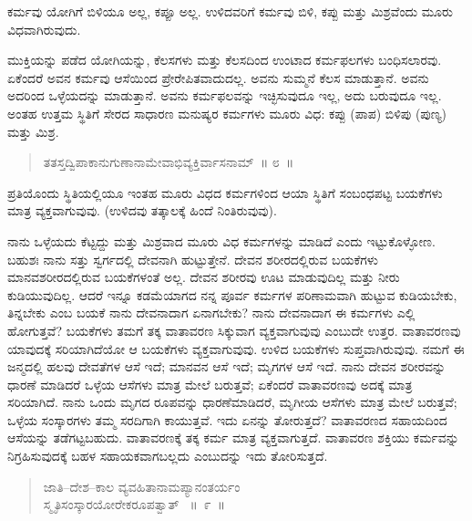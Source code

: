 ಕರ್ಮವು ಯೋಗಿಗೆ ಬಿಳಿಯೂ ಅಲ್ಲ, ಕಪ್ಪೂ ಅಲ್ಲ. ಉಳಿದವರಿಗೆ ಕರ್ಮವು ಬಿಳಿ, ಕಪ್ಪು ಮತ್ತು ಮಿಶ್ರವೆಂದು ಮೂರು ವಿಧವಾಗಿರುವುದು. 

ಮುಕ್ತಿಯನ್ನು ಪಡೆದ ಯೋಗಿಯನ್ನು, ಕೆಲಸಗಳು ಮತ್ತು ಕೆಲಸದಿಂದ ಉಂಟಾದ ಕರ್ಮಫಲಗಳು ಬಂಧಿಸಲಾರವು. ಏಕೆಂದರೆ ಅವನ ಕರ್ಮವು ಆಸೆಯಿಂದ ಪ್ರೇರೇಪಿತವಾದುದಲ್ಲ. ಅವನು ಸುಮ್ಮನೆ ಕೆಲಸ ಮಾಡುತ್ತಾನೆ. ಅವನು ಅದರಿಂದ ಒಳ್ಳೆಯದನ್ನು ಮಾಡುತ್ತಾನೆ. ಅವನು ಕರ್ಮಫಲವನ್ನು ಇಚ್ಛಿಸುವುದೂ ಇಲ್ಲ, ಅದು ಬರುವುದೂ ಇಲ್ಲ. ಅಂತಹ ಉತ್ತಮ ಸ್ಥಿತಿಗೆ ಸೇರದ ಸಾಧಾರಣ ಮನುಷ್ಯರ ಕರ್ಮಗಳು ಮೂರು ವಿಧ: ಕಪ್ಪು (ಪಾಪ) ಬಿಳಿಪು (ಪುಣ್ಯ) ಮತ್ತು ಮಿಶ್ರ. 

\vspace{-0.3cm}

\begin{verse}
ತತಸ್ತದ್ವಿಪಾಕಾನುಗುಣಾನಾಮೇವಾಭಿವ್ಯಕ್ತಿರ್ವಾಸನಾಮ್​~॥ ೮~॥
\end{verse}

\vspace{-0.3cm}

ಪ್ರತಿಯೊಂದು ಸ್ಥಿತಿಯಲ್ಲಿಯೂ ಇಂತಹ ಮೂರು ವಿಧದ ಕರ್ಮಗಳಿಂದ ಆಯಾ ಸ್ಥಿತಿಗೆ ಸಂಬಂಧಪಟ್ಟ ಬಯಕೆಗಳು ಮಾತ್ರ ವ್ಯಕ್ತವಾಗುವುವು. (ಉಳಿದವು ತತ್ಕಾಲಕ್ಕೆ ಹಿಂದೆ ನಿಂತಿರುವುವು). 

ನಾನು ಒಳ್ಳೆಯದು ಕೆಟ್ಟದ್ದು ಮತ್ತು ಮಿಶ್ರವಾದ ಮೂರು ವಿಧ ಕರ್ಮಗಳನ್ನು ಮಾಡಿದೆ ಎಂದು ಇಟ್ಟುಕೊಳ್ಳೋಣ. ಬಹುಶಃ ನಾನು ಸತ್ತು ಸ್ವರ್ಗದಲ್ಲಿ ದೇವನಾಗಿ ಹುಟ್ಟುತ್ತೇನೆ. ದೇವನ ಶರೀರದಲ್ಲಿರುವ ಬಯಕೆಗಳು ಮಾನವಶರೀರದಲ್ಲಿರುವ ಬಯಕೆಗಳಂತೆ ಅಲ್ಲ. ದೇವನ ಶರೀರವು ಊಟ ಮಾಡುವುದಿಲ್ಲ ಮತ್ತು ನೀರು ಕುಡಿಯುವುದಿಲ್ಲ. ಆದರೆ ಇನ್ನೂ ಕಡಮೆಯಾಗದ ನನ್ನ ಪೂರ್ವ ಕರ್ಮಗಳ ಪರಿಣಾಮವಾಗಿ ಹುಟ್ಟುವ ಕುಡಿಯಬೇಕು, ತಿನ್ನಬೇಕು ಎಂಬ ಬಯಕೆ ನಾನು ದೇವನಾದಾಗ ಏನಾಗಬೇಕು? ನಾನು ದೇವನಾದಾಗ ಈ ಕರ್ಮಗಳು ಎಲ್ಲಿ ಹೋಗುತ್ತವೆ? ಬಯಕೆಗಳು ತಮಗೆ ತಕ್ಕ ವಾತಾವರಣ ಸಿಕ್ಕುವಾಗ ವ್ಯಕ್ತವಾಗುವುವು ಎಂಬುದೇ ಉತ್ತರ. ವಾತಾವರಣವು ಯಾವುದಕ್ಕೆ ಸರಿಯಾಗಿದೆಯೋ ಆ ಬಯಕೆಗಳು ವ್ಯಕ್ತವಾಗುವುವು. ಉಳಿದ ಬಯಕೆಗಳು ಸುಪ್ತವಾಗಿರುವುವು. ನಮಗೆ ಈ ಜನ್ಮದಲ್ಲಿ ಹಲವು ದೇವತೆಗಳ ಆಸೆ ಇದೆ; ಮಾನವನ ಆಸೆ ಇದೆ; ಮೃಗಗಳ ಆಸೆ ಇದೆ. ನಾನು ದೇವನ ಶರೀರವನ್ನು ಧಾರಣೆ ಮಾಡಿದರೆ ಒಳ್ಳೆಯ ಆಸೆಗಳು ಮಾತ್ರ ಮೇಲೆ ಬರುತ್ತವೆ; ಏಕೆಂದರೆ ವಾತಾವರಣವು ಅದಕ್ಕೆ ಮಾತ್ರ ಸರಿಯಾಗಿದೆ. ನಾನು ಒಂದು ಮೃಗದ ರೂಪವನ್ನು ಧಾರಣೆಮಾಡಿದರೆ, ಮೃಗೀಯ ಆಸೆಗಳು ಮಾತ್ರ ಮೇಲೆ ಬರುತ್ತವೆ; ಒಳ್ಳೆಯ ಸಂಸ್ಕಾರಗಳು ತಮ್ಮ ಸರದಿಗಾಗಿ ಕಾಯುತ್ತವೆ. ಇದು ಏನನ್ನು ತೋರುತ್ತದೆ? ವಾತಾವರಣದ ಸಹಾಯದಿಂದ ಆಸೆಯನ್ನು ತಡೆಗಟ್ಟಬಹುದು. ವಾತಾವರಣಕ್ಕೆ ತಕ್ಕ ಕರ್ಮ ಮಾತ್ರ ವ್ಯಕ್ತವಾಗುತ್ತದೆ. ವಾತಾವರಣ ಶಕ್ತಿಯು ಕರ್ಮವನ್ನು ನಿಗ್ರಹಿಸುವುದಕ್ಕೆ ಬಹಳ ಸಹಾಯಕವಾಗಬಲ್ಲದು ಎಂಬುದನ್ನು ಇದು ತೋರಿಸುತ್ತದೆ. 

\vspace{-0.3cm}

\begin{verse}
ಜಾತಿ–ದೇಶ–ಕಾಲ ವ್ಯವಹಿತಾನಾಮಪ್ಯಾನಂತರ್ಯಂ\\ ಸ್ಮೃತಿಸಂಸ್ಕಾರಯೋರೇಕರೂಪತ್ವಾತ್​~ \hfill{॥~೯~॥}
\end{verse}

\vspace{-0.3cm}

